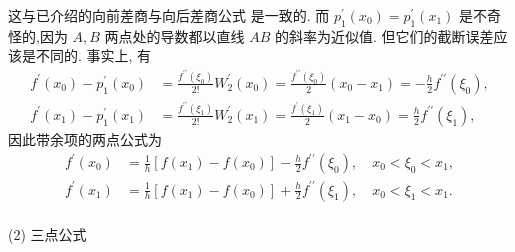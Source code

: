 这与已介绍的向前差商与向后差商公式 是一致的. 而 $ p_{1}^{\prime}\left(x_{0}\right)=p_{1}^{\prime}\left(x_{1}\right) $ 是不奇怪的,因为 $ A, B $ 两点处的导数都以直线 $ A B $ 的斜率为近似值. 但它们的截断误差应该是不同的. 事实上, 有
$$
\begin{aligned}
f^{\prime}\left(x_{0}\right)-p_{1}^{\prime}\left(x_{0}\right)&=\frac{f^{\prime \prime}\left(\xi_{0}\right)}{2!} W_{2}^{\prime}\left(x_{0}\right)=\frac{f^{\prime \prime}\left(\xi_{0}\right)}{2}\left(x_{0}-x_{1}\right)=-\frac{h}{2} f^{\prime \prime}\left(\xi_{0}\right), \\
f^{\prime}\left(x_{1}\right)-p_{1}^{\prime}\left(x_{1}\right)&=\frac{f^{\prime \prime}\left(\xi_{1}\right)}{2!} W_{2}^{\prime}\left(x_{1}\right)=\frac{f^{\prime}\left(\xi_{1}\right)}{2}\left(x_{1}-x_{0}\right)=\frac{h}{2} f^{\prime \prime}\left(\xi_{1}\right),
\end{aligned}
$$
因此带余项的两点公式为
$$
\begin{aligned}
f^{\prime}\left(x_{0}\right)&=\frac{1}{h}\left[f\left(x_{1}\right)-f\left(x_{0}\right)\right]-\frac{h}{2} f^{\prime \prime}\left(\xi_{0}\right), \quad x_{0}<\xi_{0}<x_{1}, \\
f^{\prime}\left(x_{1}\right)&=\frac{1}{h}\left[f\left(x_{1}\right)-f\left(x_{0}\right)\right]+\frac{h}{2} f^{\prime \prime}\left(\xi_{1}\right), \quad x_{0}<\xi_{1}<x_{1} . \\
\end{aligned}
$$

(2) 三点公式


